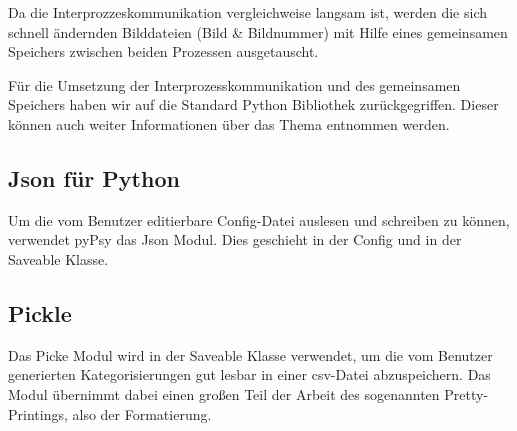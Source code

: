 \documentclass[a4paper,draft]{scrartcl}
\begin{document}
Da die Interprozzeskommunikation vergleichweise langsam ist, werden die sich schnell \"andernden Bilddateien (Bild \& Bildnummer) mit Hilfe eines gemeinsamen Speichers zwischen beiden Prozessen ausgetauscht.

F\"ur die Umsetzung der Interprozesskommunikation und des gemeinsamen Speichers haben wir auf die Standard Python Bibliothek zur\"uckgegriffen. Dieser k\"onnen auch weiter Informationen \"uber das Thema entnommen werden.

\subsection{Json für Python}
Um die vom Benutzer editierbare Config-Datei auslesen und schreiben zu können, verwendet pyPsy das Json Modul. Dies geschieht in der Config und in der Saveable Klasse. 

\subsection{Pickle}
Das Picke Modul wird in der Saveable Klasse verwendet, um die vom Benutzer generierten Kategorisierungen gut lesbar in einer csv-Datei abzuspeichern. Das Modul übernimmt dabei einen großen Teil der Arbeit des sogenannten Pretty-Printings, also der Formatierung.
\end{document}
